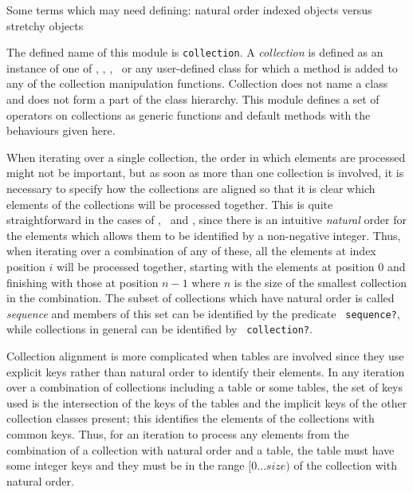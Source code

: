 %
\begin{optPrivate}
    Some terms which may need defining: natural order indexed objects versus
    stretchy objects
\end{optPrivate}
%
\begin{optDefinition}
%
The defined name of this module is {\tt collection}.  A {\em collection\/} is
defined as an instance of one of , ,
, \ or any user-defined class for which a
method is added to any of the collection manipulation functions.  Collection
does not name a class and does not form a part of the class hierarchy.  This
module defines a set of operators on collections as generic functions and
default methods with the behaviours given here.

When iterating over a single collection, the order in which elements are
processed might not be important, but as soon as more than one collection is
involved, it is necessary to specify how the collections are
aligned so that it is clear which elements
of the collections will be processed together.  This is quite straightforward in
the cases of , \ and , since
there is an intuitive {\em natural\/} order for the elements which allows them
to be identified by a non-negative integer.  Thus, when iterating over a
combination of any of these, all the elements at index position $i$ will be
processed together, starting with the elements at position $0$ and finishing
with those at position $n-1$ where $n$ is the size of the smallest collection in
the combination.  The subset of collections which have natural order is called
{\em sequence\/} and members of this set can be identified by the predicate {\tt
    sequence?}, while collections in general can be identified by {\tt
    collection?}.

Collection alignment is more complicated when tables are involved since they use
explicit keys rather than natural order to identify their elements.  In any
iteration over a combination of collections including a table or some tables,
the set of keys used is the intersection of the keys of the tables and the
implicit keys of the other collection classes present; this identifies the
elements of the collections with common keys.  Thus, for an iteration to process
any elements from the combination of a collection with natural order and a
table, the table must have some integer keys and they must be in the range
$[0\ldots{}size)$ of the collection with natural order.


\end{optDefinition}
